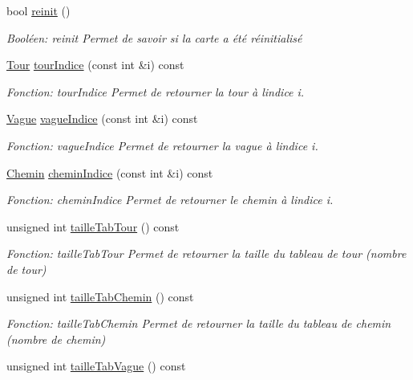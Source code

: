 \begin{DoxyCompactItemize}
bool \hyperlink{classCarte_a80741d7228490a91565f33977355da92}{reinit} ()
\begin{DoxyCompactList}\small\item\em Booléen\+: reinit Permet de savoir si la carte a été réinitialisé \end{DoxyCompactList}\item 
\hyperlink{classTour}{Tour} \hyperlink{classCarte_ace227aeaf1d279b2ac3504639816ce1b}{tour\+Indice} (const int \&i) const
\begin{DoxyCompactList}\small\item\em Fonction\+: tour\+Indice Permet de retourner la tour à l\textquotesingle{}indice i. \end{DoxyCompactList}\item 
\hyperlink{classVague}{Vague} \hyperlink{classCarte_ac8403e6b71fd024843cbd24df8a21b82}{vague\+Indice} (const int \&i) const
\begin{DoxyCompactList}\small\item\em Fonction\+: vague\+Indice Permet de retourner la vague à l\textquotesingle{}indice i. \end{DoxyCompactList}\item 
\hyperlink{classChemin}{Chemin} \hyperlink{classCarte_a6cef034e71ce9b1d39f8ddd73dbaa746}{chemin\+Indice} (const int \&i) const
\begin{DoxyCompactList}\small\item\em Fonction\+: chemin\+Indice Permet de retourner le chemin à l\textquotesingle{}indice i. \end{DoxyCompactList}\item 
unsigned int \hyperlink{classCarte_ab42ddff6b684b5d3e1942c4b637e41fd}{taille\+Tab\+Tour} () const
\begin{DoxyCompactList}\small\item\em Fonction\+: taille\+Tab\+Tour Permet de retourner la taille du tableau de tour (nombre de tour) \end{DoxyCompactList}\item 
unsigned int \hyperlink{classCarte_ab8f4fcaae33cf96d72eca6d819eb48c5}{taille\+Tab\+Chemin} () const
\begin{DoxyCompactList}\small\item\em Fonction\+: taille\+Tab\+Chemin Permet de retourner la taille du tableau de chemin (nombre de chemin) \end{DoxyCompactList}\item 
unsigned int \hyperlink{classCarte_aaca62745b070091a5b1aed99205001d0}{taille\+Tab\+Vague} () const

\end{DoxyCompactItemize}
